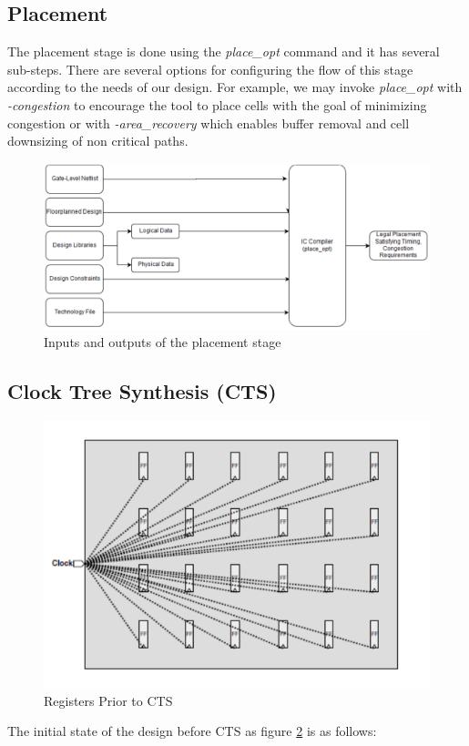 \documentclass[../main.tex]{subfiles}
\begin{document}
\subsection{Placement}
The placement stage is done using the \textit{place\_opt} command and it has several sub-steps. There are several options for configuring the flow of this stage according to the needs of our design. For example, we may invoke \textit{place\_opt} with \textit{-congestion} to encourage the tool to place cells with the goal of minimizing congestion or with \textit{-area\_recovery} which enables buffer removal and cell downsizing of non critical paths.

\begin{figure}[h]
\centering
\includegraphics[width=12cm]{diagrams/IO_placment.PNG}
\caption{ Inputs and outputs of the placement stage}
\label{fig:IO_placment}
\end{figure}
\subsection{Clock Tree Synthesis (CTS)}
\begin{figure}[h!]
    \centering
    \includegraphics[scale = 0.75]{diagrams/priorcts.jpg}
    \caption{Registers Prior to CTS}
    \label{fig:priorcts}
\end{figure}
The initial state of the design before CTS as figure \ref {fig:priorcts} is as follows:
\end{document}
